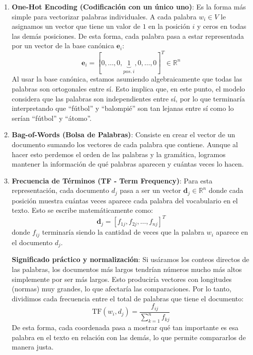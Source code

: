\documentclass[12pt,a4paper]{article}
\begin{document}
\begin{enumerate}
    \item \textbf{One-Hot Encoding (Codificación con un único uno)}: Es la forma más simple para vectorizar palabras individuales. A cada palabra $w_i \in V$ le asignamos un vector que tiene un valor de $1$ en la posición $i$ y ceros en todas las demás posiciones. De esta forma, cada palabra pasa a estar representada por un vector de la base canónica $\mathbf{e}_i$:
    \[
    \mathbf{e}_i = [0, \dots, 0, \underbrace{1}_{pos.\ i}, 0, \dots, 0]^T \in \mathbb{R}^n
    \]
    Al usar la base canónica, estamos asumiendo algebraicamente que todas las palabras son ortogonales entre sí. Esto implica que, en este punto, el modelo considera que las palabras son independientes entre sí, por lo que terminaría interpretando que ``fútbol'' y ``balompié'' son tan lejanas entre sí como lo serían ``fútbol'' y ``átomo''.
    
    \item \textbf{Bag-of-Words (Bolsa de Palabras)}: Consiste en crear el vector de un documento sumando los vectores de cada palabra que contiene. Aunque al hacer esto perdemos el orden de las palabras y la gramática, logramos mantener la información de qué palabras aparecen y cuántas veces lo hacen.
    
    \item \textbf{Frecuencia de Términos (TF - Term Frequency)}: Para esta representación, cada documento $d_j$ pasa a ser un vector $\mathbf{d}_j \in \mathbb{R}^n$ donde cada posición muestra cuántas veces aparece cada palabra del vocabulario en el texto. Esto se escribe matemáticamente como:
    \[
    \mathbf{d}_j = [f_{1j}, f_{2j}, \dots, f_{nj}]^T
    \]
    donde $f_{ij}$ terminaría siendo la cantidad de veces que la palabra $w_i$ aparece en el documento $d_j$.
    
    \textbf{Significado práctico y normalización}: Si usáramos los conteos directos de las palabras, los documentos más largos tendrían números mucho más altos simplemente por ser más largos. Esto produciría vectores con longitudes (normas) muy grandes, lo que afectaría las comparaciones. Por lo tanto, dividimos cada frecuencia entre el total de palabras que tiene el documento:
    \[
    \text{TF}(w_i, d_j) = \frac{f_{ij}}{\sum_{k=1}^n f_{kj}}
    \]
    De esta forma, cada coordenada pasa a mostrar qué tan importante es esa palabra en el texto en relación con las demás, lo que permite compararlos de manera justa.
\end{enumerate}
\end{document}
